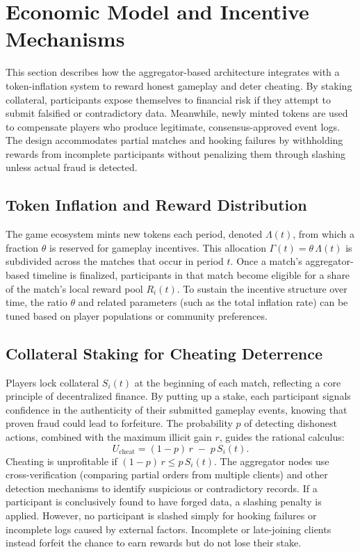 \documentclass[11pt]{article}
\begin{document}
\section{Economic Model and Incentive Mechanisms}
\label{sec:econ-model}
This section describes how the aggregator-based architecture integrates with a token-inflation system to reward honest gameplay and deter cheating. By staking collateral, participants expose themselves to financial risk if they attempt to submit falsified or contradictory data. Meanwhile, newly minted tokens are used to compensate players who produce legitimate, consensus-approved event logs. The design accommodates partial matches and hooking failures by withholding rewards from incomplete participants without penalizing them through slashing unless actual fraud is detected.

\subsection{Token Inflation and Reward Distribution}
The game ecosystem mints new tokens each period, denoted $\Lambda(t)$, from which a fraction $\theta$ is reserved for gameplay incentives. This allocation $\Gamma(t) = \theta\,\Lambda(t)$ is subdivided across the matches that occur in period $t$. Once a match’s aggregator-based timeline is finalized, participants in that match become eligible for a share of the match’s local reward pool $R_i(t)$. To sustain the incentive structure over time, the ratio $\theta$ and related parameters (such as the total inflation rate) can be tuned based on player populations or community preferences.

\subsection{Collateral Staking for Cheating Deterrence}
Players lock collateral $S_i(t)$ at the beginning of each match, reflecting a core principle of decentralized finance. By putting up a stake, each participant signals confidence in the authenticity of their submitted gameplay events, knowing that proven fraud could lead to forfeiture. The probability $p$ of detecting dishonest actions, combined with the maximum illicit gain $r$, guides the rational calculus: 
\[
U_{\text{cheat}} = (1 - p)\,r \;-\; p\,S_i(t).
\]
Cheating is unprofitable if $(1 - p)\,r \le p\,S_i(t)$. The aggregator nodes use cross-verification (comparing partial orders from multiple clients) and other detection mechanisms to identify suspicious or contradictory records. If a participant is conclusively found to have forged data, a slashing penalty is applied. However, no participant is slashed simply for hooking failures or incomplete logs caused by external factors. Incomplete or late-joining clients instead forfeit the chance to earn rewards but do not lose their stake.
\end{document}
